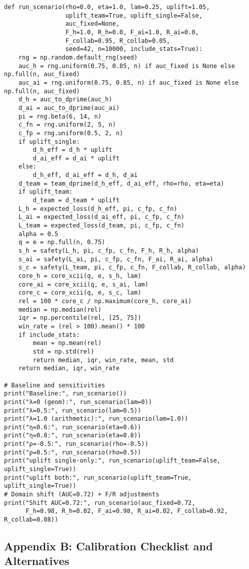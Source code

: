 \documentclass[a4paper]{article}
\begin{document}
\begin{verbatim}
def run_scenario(rho=0.0, eta=1.0, lam=0.25, uplift=1.05,
                 uplift_team=True, uplift_single=False,
                 auc_fixed=None,
                 F_h=1.0, R_h=0.0, F_ai=1.0, R_ai=0.0,
                 F_collab=0.95, R_collab=0.05,
                 seed=42, n=10000, include_stats=True):
    rng = np.random.default_rng(seed)
    auc_h = rng.uniform(0.75, 0.85, n) if auc_fixed is None else np.full(n, auc_fixed)
    auc_ai = rng.uniform(0.75, 0.85, n) if auc_fixed is None else np.full(n, auc_fixed)
    d_h = auc_to_dprime(auc_h)
    d_ai = auc_to_dprime(auc_ai)
    pi = rng.beta(6, 14, n)
    c_fn = rng.uniform(2, 5, n)
    c_fp = rng.uniform(0.5, 2, n)
    if uplift_single:
        d_h_eff = d_h * uplift
        d_ai_eff = d_ai * uplift
    else:
        d_h_eff, d_ai_eff = d_h, d_ai
    d_team = team_dprime(d_h_eff, d_ai_eff, rho=rho, eta=eta)
    if uplift_team:
        d_team = d_team * uplift
    L_h = expected_loss(d_h_eff, pi, c_fp, c_fn)
    L_ai = expected_loss(d_ai_eff, pi, c_fp, c_fn)
    L_team = expected_loss(d_team, pi, c_fp, c_fn)
    alpha = 0.5
    q = e = np.full(n, 0.75)
    s_h = safety(L_h, pi, c_fp, c_fn, F_h, R_h, alpha)
    s_ai = safety(L_ai, pi, c_fp, c_fn, F_ai, R_ai, alpha)
    s_c = safety(L_team, pi, c_fp, c_fn, F_collab, R_collab, alpha)
    core_h = core_xcii(q, e, s_h, lam)
    core_ai = core_xcii(q, e, s_ai, lam)
    core_c = core_xcii(q, e, s_c, lam)
    rel = 100 * core_c / np.maximum(core_h, core_ai)
    median = np.median(rel)
    iqr = np.percentile(rel, [25, 75])
    win_rate = (rel > 100).mean() * 100
    if include_stats:
        mean = np.mean(rel)
        std = np.std(rel)
        return median, iqr, win_rate, mean, std
    return median, iqr, win_rate

# Baseline and sensitivities
print("Baseline:", run_scenario())
print("λ=0 (geom):", run_scenario(lam=0))
print("λ=0.5:", run_scenario(lam=0.5))
print("λ=1.0 (arithmetic):", run_scenario(lam=1.0))
print("η=0.6:", run_scenario(eta=0.6))
print("η=0.8:", run_scenario(eta=0.8))
print("ρ=-0.5:", run_scenario(rho=-0.5))
print("ρ=0.5:", run_scenario(rho=0.5))
print("uplift single-only:", run_scenario(uplift_team=False, uplift_single=True))
print("uplift both:", run_scenario(uplift_team=True, uplift_single=True))
# Domain shift (AUC=0.72) + F/R adjustments
print("Shift AUC=0.72:", run_scenario(auc_fixed=0.72,
      F_h=0.98, R_h=0.02, F_ai=0.98, R_ai=0.02, F_collab=0.92, R_collab=0.08))
\end{verbatim}

\subsection{Appendix B: Calibration Checklist and
Alternatives}\label{appendix-b-calibration-checklist-and-alternatives}
\end{document}
